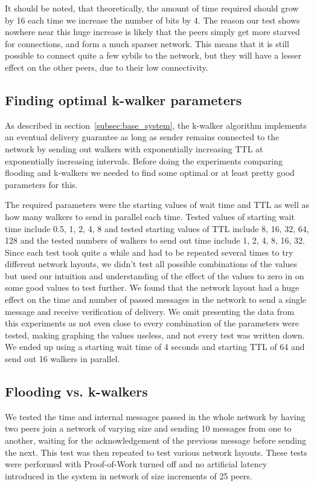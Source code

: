 It should be noted, that theoretically, the amount of time required should grow by 16 each time we increase the number of bits by 4. The reason our test shows nowhere near this huge increase is likely that the peers simply get more starved for connections, and form a much sparser network. This means that it is still possible to connect quite a few sybils to the network, but they will have a lesser effect on the other peers, due to their low connectivity.

\subsection{Finding optimal k-walker parameters}
\label{subsec:k_opti_params}
As described in section~\ref{subsec:base_system}, the k-walker algorithm implements an eventual delivery guarantee as long as sender remains connected to the network by sending out walkers with exponentially increasing TTL at exponentially increasing intervals. Before doing the experiments comparing flooding and k-walkers we needed to find some optimal or at least pretty good parameters for this.

The required parameters were the starting values of wait time and TTL as well as how many walkers to send in parallel each time. Tested values of starting wait time include 0.5, 1, 2, 4, 8 and tested starting values of TTL include 8, 16, 32, 64, 128 and the tested numbers of walkers to send out time include 1, 2, 4, 8, 16, 32. Since each test took quite a while and had to be repeated several times to try different network layouts, we didn't test all possible combinations of the values but used our intuition and understanding of the effect of the values to zero in on some good values to test further. We found that the network layout had a huge effect on the time and number of passed messages in the network to send a single message and receive verification of delivery. We omit presenting the data from this experiments as not even close to every combination of the parameters were tested, making graphing the values useless, and not every test was written down. We ended up using a starting wait time of 4 seconds and starting TTL of 64 and send out 16 walkers in parallel.

\subsection{Flooding vs. k-walkers}
We tested the time and internal messages passed in the whole network by having two peers join a network of varying size and sending 10 messages from one to another, waiting for the acknowledgement of the previous message before sending the next. This test was then repeated to test various network layouts. These tests were performed with Proof-of-Work turned off and no artificial latency introduced in the system in network of size increments of 25 peers.

